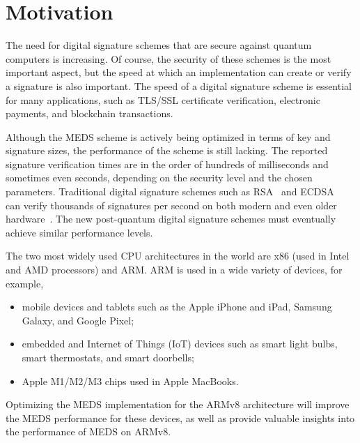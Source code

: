 \documentclass[11pt,a4paper]{report}
\theoremstyle{definition}
\begin{document}
\section{Motivation}
The need for digital signature schemes that are secure against quantum computers is increasing. Of course, the security of these schemes is the most important aspect, but the speed at which an implementation can create or verify a signature is also important. The speed of a digital signature scheme is essential for many applications, such as TLS/SSL certificate verification, electronic payments, and blockchain transactions.

Although the MEDS scheme is actively being optimized in terms of key and signature sizes, the performance of the scheme is still lacking. The reported signature verification times are in the order of hundreds of milliseconds and sometimes even seconds, depending on the security level and the chosen parameters. Traditional digital signature schemes such as RSA~\cite{rivest1978method} and ECDSA~\cite{johnson2001elliptic} can verify thousands of signatures per second on both modern and even older hardware~\cite{de1998performance,koppl2021performance}. The new post-quantum digital signature schemes must eventually achieve similar performance levels.

The two most widely used CPU architectures in the world are x86 (used in Intel and AMD processors) and ARM. ARM is used in a wide variety of devices, for example,
\begin{itemize}
  \item mobile devices and tablets such as the Apple iPhone and iPad, Samsung Galaxy, and Google Pixel;
  \item embedded and Internet of Things (IoT) devices such as smart light bulbs, smart thermostats, and smart doorbells;
  \item Apple M1/M2/M3 chips used in Apple MacBooks.
\end{itemize}
Optimizing the MEDS implementation for the ARMv8 architecture will improve the MEDS performance for these devices, as well as provide valuable insights into the performance of MEDS on ARMv8.
\end{document}
